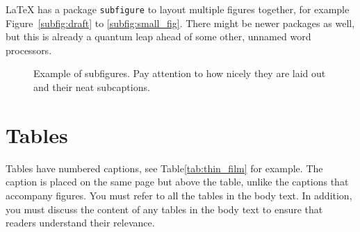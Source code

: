\documentclass[12pt,a4paper,finnish]{tutthesis}
\begin{document}
LaTeX has a package \texttt{subfigure} to layout multiple figures
together, for example Figure~\ref{subfig:draft} to
\ref{subfig:small_fig}. There might be newer packages as well, but this is
already a quantum leap ahead of some other, unnamed word processors.
\begin{figure}
  \begin{center}
    \qquad                        %
    \caption[Example of subfigures]{Example of subfigures. Pay attention to how nicely they
      are laid out and their neat subcaptions.}

    \label{fig:subfigs}
  \end{center}
\end{figure}


\section{Tables}

Tables have numbered captions, see Table\ref{tab:thin_film} for
example. The caption is placed on the same page but above the table,
unlike the captions that accompany figures. You must refer to all the
tables in the body text. In addition, you must discuss the content of
any tables in the body text to ensure that readers understand their
relevance.
%
%
\end{document}
